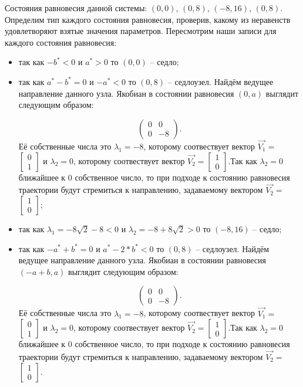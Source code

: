 Состояния равновесия данной системы: $(0, 0)$, $(0, 8)$, $(-8, 16)$, $(0, 8)$. Определим тип каждого состояния равновесия, проверив, какому из неравенств удовлетворяют взятые значения параметров.  Пересмотрим наши записи для каждого состояния равновесия: 
\begin{itemize}
	\item{ так как $-b^\ast  < 0 $ и $a^\ast > 0 $ то $(0, 0)$ -- седло;}
	\item{ так как $a^\ast - b^\ast = 0 $ и $-a^\ast  < 0 $ то $(0, 8)$ -- седлоузел. Найдём ведущее направление данного узла. Якобиан в состоянии равновесия $(0, a)$ выглядит следующим образом:
		
		$$\begin{pmatrix}0 & 0\\0 & -8\end{pmatrix}. $$Её собственные числа это $\lambda_1=-8$, которому соотвествует вектор $\Vec{V_1}=$ $\left[\begin{matrix}0\\1\end{matrix}\right]$ и $\lambda_2=0$, которому соотвествует вектор $\Vec{V_2}=$$\left[\begin{matrix}1\\0\end{matrix}\right]$.Так как $\lambda_2=0$ ближайшее к $0$ собственное число, то при подходе к состоянию равновесия траектории будут стремиться к направлению, задаваемому вектором $\Vec{V_2}=$ $\left[\begin{matrix}1\\0\end{matrix}\right]$;}
	\item{ так как ${\lambda_{1}} = - 8 \sqrt{2} - 8$$  < 0 $ и ${\lambda_{2}} = -8 + 8 \sqrt{2}$$ > 0 $ то $(-8, 16)$ -- седло;}
	\item{ так как $-a^\ast + b^\ast = 0 $ и $a^\ast - 2*b^\ast  < 0 $ то $(0, 8)$ -- седлоузел. Найдём ведущее направление данного узла. Якобиан в состоянии равновесия $(-a + b, a)$ выглядит следующим образом:
		
		$$\begin{pmatrix}0 & 0\\0 & -8\end{pmatrix}. $$Её собственные числа это $\lambda_1=-8$, которому соотвествует вектор $\Vec{V_1}=$ $\left[\begin{matrix}0\\1\end{matrix}\right]$ и $\lambda_2=0$, которому соотвествует вектор $\Vec{V_2}=$$\left[\begin{matrix}1\\0\end{matrix}\right]$.Так как $\lambda_2=0$ ближайшее к $0$ собственное число, то при подходе к состоянию равновесия траектории будут стремиться к направлению, задаваемому вектором $\Vec{V_2}=$ $\left[\begin{matrix}1\\0\end{matrix}\right]$.}
\end{itemize} 

